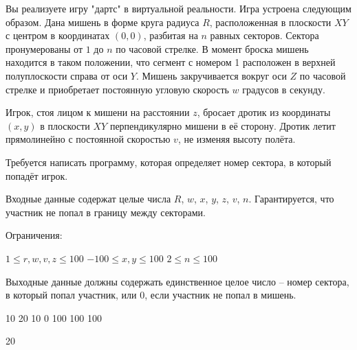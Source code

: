 
Вы реализуете игру "дартс" в виртуальной реальности. Игра устроена следующим образом. Дана мишень в форме круга радиуса $R$, расположенная в плоскости $XY$ с центром в координатах $(0, 0)$, разбитая на $n$ равных секторов. Сектора пронумерованы от $1$ до $n$ по часовой стрелке. В момент броска мишень находится в таком положении, что сегмент с номером 1 расположен в верхней полуплоскости справа от оси $Y$. Мишень закручивается вокруг оси $Z$ по часовой стрелке и приобретает постоянную угловую скорость $w$ градусов в секунду. 

Игрок, стоя лицом к мишени на расстоянии $z$, бросает дротик из координаты $(x, y)$ в плоскости $XY$ перпендикулярно мишени в её сторону. Дротик летит прямолинейно с постоянной скоростью $v$, не изменяя высоту полёта.

Требуется написать программу, которая определяет номер сектора, в который попадёт игрок.


Входные данные содержат целые числа $R$, $w$, $x$, $y$, $z$, $v$, $n$. Гарантируется, что участник не попал в границу между секторами.

Ограничения:

$1 \le r, w, v, z \le 100$
$-100 \le x, y \le 100$
$2 \le n \le 100 $

\outputfmtSection

Выходные данные должны содержать единственное целое число -- номер сектора, в который попал участник, или 0, если участник не попал в мишень.


\begin{myverbbox}[\small]{\vinput}
    10 20 10 0 100 100 100
\end{myverbbox}
\begin{myverbbox}[\small]{\voutput}
    20
\end{myverbbox}

